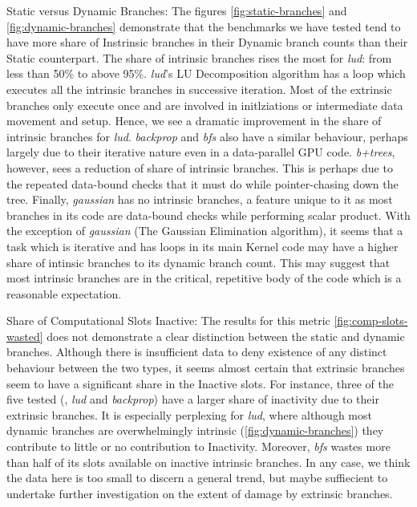 

\label{sec:conclusion}
\par{Static versus Dynamic Branches: The figures \ref{fig:static-branches} and \ref{fig:dynamic-branches} demonstrate that the benchmarks we have
tested tend to have more share of Instrinsic branches in their Dynamic branch counts than their Static counterpart. The share of intrinsic branches rises the most for \textsl{lud}: from less than 50\% to above 95\%. \textsl{lud}'s LU Decomposition algorithm has a loop which executes all the intrinsic branches in successive iteration. Most of the extrinsic branches only execute once and are involved in initlziations or intermediate data movement and setup. Hence, we see a dramatic improvement in the share of intrinsic branches for \textsl{lud}. \textsl{backprop} and \textsl{bfs} also have a similar behaviour, perhaps largely due to their iterative nature even in a data-parallel GPU code. \textsl{b+trees}, however, sees a reduction of share of intrinsic branches. This is perhaps due to the repeated data-bound checks that it must do while pointer-chasing down the tree. Finally, \textsl{gaussian} has no intrinsic branches, a feature unique to it as most branches in its code are data-bound checks while performing scalar product. With the exception of \textsl{gaussian} (The Gaussian Elimination algorithm), it seems that a task which is iterative and has loops in its main Kernel code may have a higher share of intinsic branches to its dynamic branch count. This may suggest that most intrinsic branches are in the critical, repetitive body of the code which is a reasonable expectation.}

\par{Share of Computational Slots Inactive: The results for this metric \ref{fig:comp-slots-wasted} does not demonstrate a clear distinction between the static and dynamic branches. Although there is insufficient data to deny existence of any distinct behaviour between the two types, it seems almost certain that extrinsic branches seem to have a significant share in the Inactive slots. For instance, three of the five tested (, \textsl{lud} and \textsl{backprop}) have a larger share of inactivity due to their extrinsic branches. It is especially perplexing for \textsl{lud}, where although most dynamic branches are overwhelmingly intrinsic (\ref{fig:dynamic-branches}) they contribute to little or no contribution to Inactivity. Moreover, \textsl{bfs} wastes more than half of its slots available on inactive intrinsic branches. In any case, we think the data here is too small to discern a general trend, but maybe suffiecient to undertake further investigation on the extent of damage by extrinsic branches.
}

